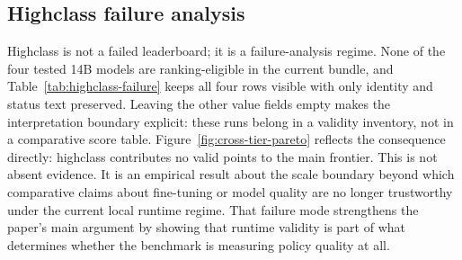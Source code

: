 \subsection{Highclass failure analysis}

Highclass is not a failed leaderboard; it is a failure-analysis regime. None of the four tested 14B models are ranking-eligible in the current bundle, and Table~\ref{tab:highclass-failure} keeps all four rows visible with only identity and status text preserved. Leaving the other value fields empty makes the interpretation boundary explicit: these runs belong in a validity inventory, not in a comparative score table. Figure~\ref{fig:cross-tier-pareto} reflects the consequence directly: highclass contributes no valid points to the main frontier. This is not absent evidence. It is an empirical result about the scale boundary beyond which comparative claims about fine-tuning or model quality are no longer trustworthy under the current local runtime regime. That failure mode strengthens the paper's main argument by showing that runtime validity is part of what determines whether the benchmark is measuring policy quality at all.
